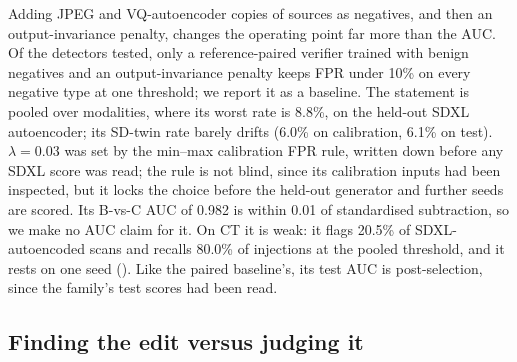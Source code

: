 Adding JPEG and VQ-autoencoder copies of sources as negatives, and then an output-invariance penalty, changes the operating point far more than the AUC.
Of the detectors tested, only a reference-paired verifier trained with benign negatives and an output-invariance penalty keeps FPR under 10\% on every negative type at one threshold; we report it as a baseline. %
The statement is pooled over modalities, where its worst rate is 8.8\%, on the held-out SDXL autoencoder; %
its SD-twin rate barely drifts (6.0\% on calibration, 6.1\% on test). %
$\lambda=0.03$ was set by the min--max calibration FPR rule, written down before any SDXL score was read; the rule is not blind, since its calibration inputs had been inspected, but it locks the choice before the held-out generator and further seeds are scored. %
Its B-vs-C AUC of 0.982 is within 0.01 of standardised subtraction, so we make no AUC claim for it. %
On CT it is weak: it flags 20.5\% of SDXL-autoencoded scans and recalls 80.0\% of injections at the pooled threshold, %
and it rests on one seed ().
Like the paired baseline's, its test AUC is post-selection, since the family's test scores had been read.

\subsection{Finding the edit versus judging it}
\label{sec:oracle}

